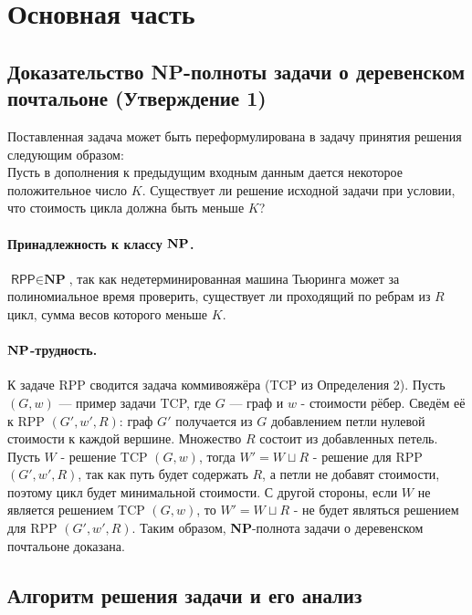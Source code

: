 \newpage
\section{Основная часть}
\subsection{Доказательство \textbf{NP}-полноты задачи о деревенском почтальоне (Утверждение 1)}
Поставленная задача может быть переформулирована в задачу принятия решения следующим образом: \\
    Пусть в дополнения к предыдущим входным данным дается некоторое положительное число $K$. Существует ли решение исходной задачи при условии, что стоимость цикла должна быть меньше $K$? 

\paragraph{Принадлежность к классу $\bf{NP}$.}
$\textsf{RPP} \in \textbf{NP}$, так как недетерминированная машина Тьюринга может за полиномиальное время проверить, существует ли проходящий по ребрам из $R$ цикл, сумма весов которого меньше $K$.

\paragraph{$\bf{NP}$-трудность.}
К задаче \textsf{RPP} сводится задача коммивояжёра (TCP из Определения 2). Пусть $(G,w)$ — пример задачи \textsf{TCP}, где $G$ — граф и $w$ - стоимости рёбер. Сведём её к \textsf{RPP} $(G', w', R)$:
граф $G'$ получается из $G$ добавлением петли нулевой стоимости к каждой вершине. Множество $R$ состоит из добавленных петель. Пусть $W$ - решение \textsf{TCP} $(G, w)$, тогда $W' = W \sqcup R$ - решение  для \textsf{RPP} $(G', w', R)$, так как путь будет содержать $R$, а петли не добавят стоимости, поэтому цикл будет минимальной стоимости. С другой стороны, если $W$ не является решением \textsf{TCP} $(G, w)$, то $W' = W \sqcup R$ - не будет являться решением  для \textsf{RPP} $(G', w', R)$. Таким образом, \textbf{NP}-полнота задачи о \textsf{деревенском почтальоне доказана.}

\subsection{Алгоритм решения задачи и его анализ}

